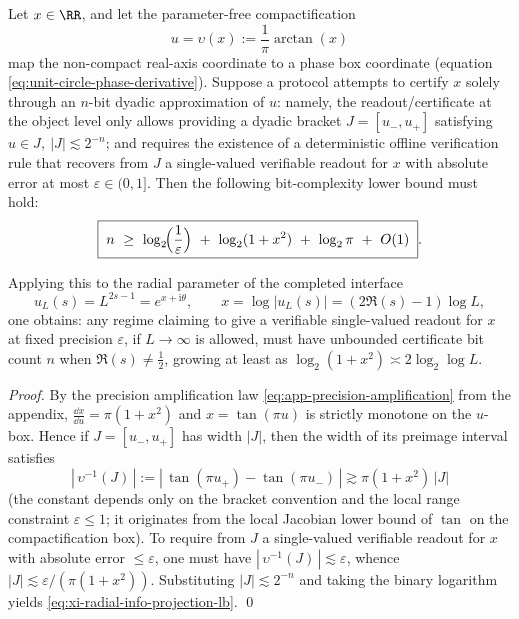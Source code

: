 \begin{theorem}\label{thm:xi-radial-information-projection-lower-bound}
Let \(x\in\RR\), and let the parameter-free compactification
\[
u=\upsilon(x):=\frac{1}{\pi}\arctan(x)
\]
map the non-compact real-axis coordinate to a phase box coordinate (equation \eqref{eq:unit-circle-phase-derivative}).
Suppose a protocol attempts to certify \(x\) solely through an \(n\)-bit dyadic approximation of \(u\):
namely, the readout/certificate at the object level only allows providing a dyadic bracket \(J=[u_-,u_+]\) satisfying
\(
u\in J,\ |J|\lesssim 2^{-n}
\);
and requires the existence of a deterministic offline verification rule that recovers from \(J\) a single-valued verifiable readout for \(x\) with absolute error at most \(\varepsilon\in(0,1]\).
Then the following bit-complexity lower bound must hold:
\begin{equation}\label{eq:xi-radial-info-projection-lb}
\boxed{\;
n\ \ge\ \log_2\!\Bigl(\frac{1}{\varepsilon}\Bigr)\ +\ \log_2(1+x^2)\ +\ \log_2\pi\ +\ O(1)\; }.
\end{equation}
\par
Applying this to the radial parameter of the completed interface
\[
u_L(s)=L^{2s-1}=e^{x+\mathrm{i}\theta},
\qquad
x=\log|u_L(s)|=(2\Re(s)-1)\log L,
\]
one obtains: any regime claiming to give a verifiable single-valued readout for \(x\) at fixed precision \(\varepsilon\), if \(L\to\infty\) is allowed, must have unbounded certificate bit count \(n\) when \(\Re(s)\neq\tfrac12\), growing at least as \(\log_2(1+x^2)\asymp 2\log_2\log L\).
\end{theorem}

\begin{proof}
By the precision amplification law \eqref{eq:app-precision-amplification} from the appendix,
\(
\frac{\dd x}{\dd u}=\pi(1+x^2)
\)
and \(x=\tan(\pi u)\) is strictly monotone on the \(u\)-box.
Hence if \(J=[u_-,u_+]\) has width \(|J|\), then the width of its preimage interval satisfies
\[
|\,\upsilon^{-1}(J)\,|
:=|\,\tan(\pi u_+)-\tan(\pi u_-)\,|
\gtrsim \pi(1+x^2)\,|J|
\]
(the constant depends only on the bracket convention and the local range constraint \(\varepsilon\le 1\); it originates from the local Jacobian lower bound of \(\tan\) on the compactification box).
To require from \(J\) a single-valued verifiable readout for \(x\) with absolute error \(\le\varepsilon\), one must have
\(
|\,\upsilon^{-1}(J)\,|\lesssim \varepsilon
\), whence
\(
|J|\lesssim \varepsilon/(\pi(1+x^2))
\).
Substituting \(|J|\lesssim 2^{-n}\) and taking the binary logarithm yields \eqref{eq:xi-radial-info-projection-lb}. \qed
\end{proof}

